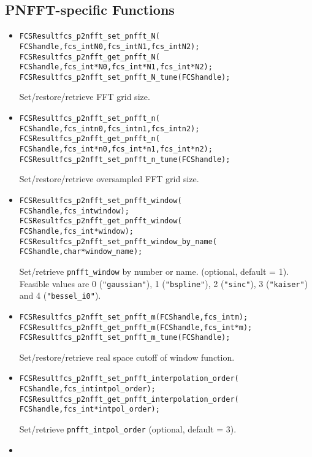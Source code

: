 \subsection{PNFFT-specific Functions}
\begin{itemize}
  \item
\begin{alltt}
FCSResult fcs_p2nfft_set_pnfft_N(
    FCS handle, fcs_int N0, fcs_int N1, fcs_int N2);
FCSResult fcs_p2nfft_get_pnfft_N(
    FCS handle, fcs_int* N0, fcs_int* N1, fcs_int* N2);
FCSResult fcs_p2nfft_set_pnfft_N_tune(FCS handle);
\end{alltt}
    Set/restore/retrieve FFT grid size.
  \item
\begin{alltt}
FCSResult fcs_p2nfft_set_pnfft_n(
    FCS handle, fcs_int n0, fcs_int n1, fcs_int n2);
FCSResult fcs_p2nfft_get_pnfft_n(
    FCS handle, fcs_int* n0, fcs_int* n1, fcs_int* n2);
FCSResult fcs_p2nfft_set_pnfft_n_tune(FCS handle);
\end{alltt}
    Set/restore/retrieve oversampled FFT grid size.
  \item
\begin{alltt}
FCSResult fcs_p2nfft_set_pnfft_window(
    FCS handle, fcs_int window);
FCSResult fcs_p2nfft_get_pnfft_window(
    FCS handle, fcs_int* window);
FCSResult fcs_p2nfft_set_pnfft_window_by_name(
    FCS handle, char* window_name );
\end{alltt}
    Set/retrieve \verb!pnfft_window! by number or name. (optional, default = 1).
    Feasible values are 0 (\verb!"gaussian"!), 1 (\verb!"bspline"!), 2 (\verb!"sinc"!), 3 (\verb!"kaiser"!) and 4 (\verb!"bessel_i0"!).
  \item
\begin{alltt}
FCSResult fcs_p2nfft_set_pnfft_m(FCS handle, fcs_int m);
FCSResult fcs_p2nfft_get_pnfft_m(FCS handle, fcs_int* m);
FCSResult fcs_p2nfft_set_pnfft_m_tune(FCS handle);
\end{alltt}
    Set/restore/retrieve real space cutoff of window function.
  \item
\begin{alltt}
FCSResult fcs_p2nfft_set_pnfft_interpolation_order(
    FCS handle, fcs_int intpol_order);
FCSResult fcs_p2nfft_get_pnfft_interpolation_order(
    FCS handle, fcs_int* intpol_order);
\end{alltt}
    Set/retrieve \verb!pnfft_intpol_order! (optional, default = 3).
  \item
\begin{alltt}

\end{alltt}
\end{itemize}

